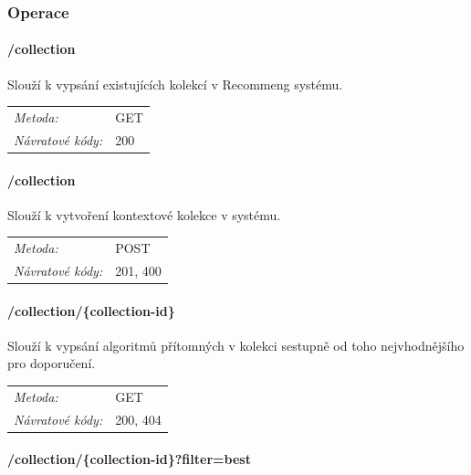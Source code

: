 \documentclass[thesis=M,czech]{FITthesis}[2014/05/07]
\begin{document}
\subsubsection{Operace}

\paragraph*{/collection}

Slouží k vypsání existujících kolekcí v Recommeng systému.

\begin{center}
 	\begin{tabular}{lp{10cm}}
 		\textit{Metoda:}		& GET			\tabularnewline 
 		\textit{Návratové kódy:}		& 200			\tabularnewline 		
 	\end{tabular}	
\end{center} 

\paragraph*{/collection}

Slouží k vytvoření kontextové kolekce v systému.

\begin{center}
 	\begin{tabular}{lp{10cm}}
 		\textit{Metoda:}		& POST			\tabularnewline 
 		\textit{Návratové kódy:}		& 201, 400			\tabularnewline 		
 	\end{tabular}	
\end{center} 

\paragraph*{/collection/\{collection-id\}}

Slouží k vypsání algoritmů přítomných v kolekci sestupně od toho nejvhodnějšího pro doporučení.

\begin{center}
 	\begin{tabular}{lp{10cm}}
 		\textit{Metoda:}		& GET			\tabularnewline 
 		\textit{Návratové kódy:}		& 200, 404			\tabularnewline 		
 	\end{tabular}	
\end{center} 

\paragraph*{/collection/\{collection-id\}?filter=best}
\end{document}
